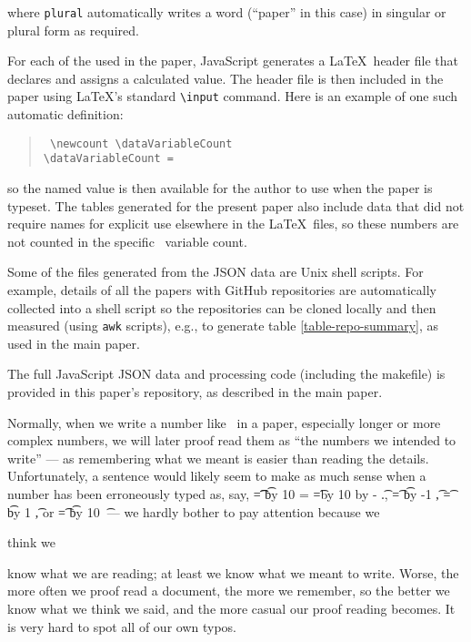\documentclass[10pt,a4paper]{article}
\begin{document}
where {\tt\small \bslash plural} automatically writes a word (``paper'' in this case) in singular or plural form as required. 

\begin{change}For each of the  used in the paper, JavaScript generates a \LaTeX\ header file that declares and assigns a calculated value. The header file is then included in the paper using \LaTeX's standard \texttt{\textbackslash input} command. Here is an example of one such automatic definition:

\begin{verse}\tt
\textbackslash newcount \textbackslash dataVariableCount \\
\textbackslash dataVariableCount = \the\dataVariableCount
\end{verse}

so the named value is then available for the author to use when the paper is typeset. The tables generated for the present paper also include data that did not require names for explicit use elsewhere in the \LaTeX\ files, so these numbers are not counted in the specific \the\dataVariableCount\ variable count.
\end{change}

Some of the files generated from the JSON data are Unix shell scripts. For example, details of all the papers with GitHub repositories are automatically collected into a shell script so the repositories can be cloned locally and then measured (using \texttt{awk} scripts), e.g., to generate table \ref{table-repo-summary}, as used in the main paper.

The full JavaScript JSON data and processing code (including the makefile) is provided in this paper's repository, as described in the main paper.

\label{detecting-against-error}

Normally, when we write a number like \the\countUsesVersionControlRepository\ in a paper, especially longer or more complex numbers, we will later proof read them as ``the numbers we intended to write'' --- as remembering what we meant is easier than reading the details. Unfortunately, a sentence would likely seem to make as much sense when a number has been erroneously typed as, say,
\newcount\t
\t=\countUsesVersionControlRepository
\divide \t by 10
\newcount\fraction
\fraction=\countUsesVersionControlRepository
\newcount\tent \tent=\t \multiply \tent by 10
\advance\fraction by -\tent
\the\t.\the\fraction,
\t=\countUsesVersionControlRepository
\advance \t by -1
\the\t,
\t=\countUsesVersionControlRepository
\advance \t by 1
\the\t, or
\t=\countUsesVersionControlRepository
\multiply \t by 10
\the\t\ --- we hardly bother to pay attention because we \begin{change}think we\end{change} know what we are reading; at least we know what we meant to write. Worse, the more often we proof read a document, the more we remember, so the better we know what we think we said, and the more casual our proof reading becomes. It is very hard to spot all of our own typos. 
\end{document}
